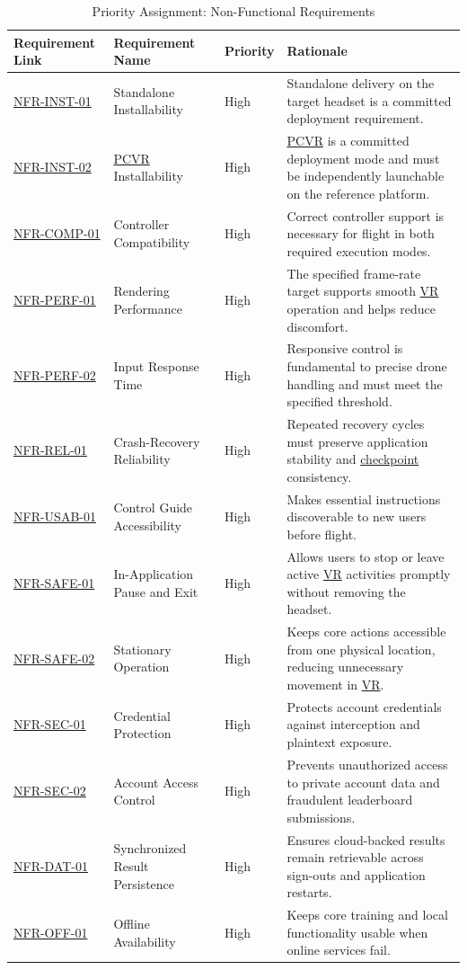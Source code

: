 \documentclass[12pt]{article}
\begin{document}
\begin{table}[htbp]
\centering
\small
\caption{Priority Assignment: Non-Functional Requirements}
\label{tab:priority-nfr}
\begin{tabular}{p{2.1cm} p{2.7cm} p{1.3cm} p{7.0cm}}
\hline
\textbf{Requirement Link} & \textbf{Requirement Name} & \textbf{Priority} & \textbf{Rationale} \\
\hline
\hyperref[sec:s2-nfr]{NFR-INST-01} & Standalone Installability & High & Standalone delivery on the target headset is a committed deployment requirement. \\
\hyperref[sec:s2-nfr]{NFR-INST-02} & \hyperlink{glos:PCVR}{PCVR} Installability & High & \hyperlink{glos:PCVR}{PCVR} is a committed deployment mode and must be independently launchable on the reference platform. \\
\hyperref[sec:s2-nfr]{NFR-COMP-01} & Controller Compatibility & High & Correct controller support is necessary for flight in both required execution modes. \\
\hyperref[sec:s2-nfr]{NFR-PERF-01} & Rendering Performance & High & The specified frame-rate target supports smooth \hyperlink{glos:VR}{VR} operation and helps reduce discomfort. \\
\hyperref[sec:s2-nfr]{NFR-PERF-02} & Input Response Time & High & Responsive control is fundamental to precise drone handling and must meet the specified threshold. \\
\hyperref[sec:s2-nfr]{NFR-REL-01} & Crash-Recovery Reliability & High & Repeated recovery cycles must preserve application stability and \hyperlink{glos:Checkpoint}{checkpoint} consistency. \\
\hyperref[sec:s2-nfr]{NFR-USAB-01} & Control Guide Accessibility & High & Makes essential instructions discoverable to new users before flight. \\
\hyperref[sec:s2-nfr]{NFR-SAFE-01} & In-Application Pause and Exit & High & Allows users to stop or leave active \hyperlink{glos:VR}{VR} activities promptly without removing the headset. \\
\hyperref[sec:s2-nfr]{NFR-SAFE-02} & Stationary Operation & High & Keeps core actions accessible from one physical location, reducing unnecessary movement in \hyperlink{glos:VR}{VR}. \\
\hyperref[sec:s2-nfr]{NFR-SEC-01} & Credential Protection & High & Protects account credentials against interception and plaintext exposure. \\
\hyperref[sec:s2-nfr]{NFR-SEC-02} & Account Access Control & High & Prevents unauthorized access to private account data and fraudulent leaderboard submissions. \\
\hyperref[sec:s2-nfr]{NFR-DAT-01} & Synchronized Result Persistence & High & Ensures cloud-backed results remain retrievable across sign-outs and application restarts. \\
\hyperref[sec:s2-nfr]{NFR-OFF-01} & Offline Availability & High & Keeps core training and local functionality usable when online services fail. \\
\hline
\end{tabular}
\end{table}
\end{document}
